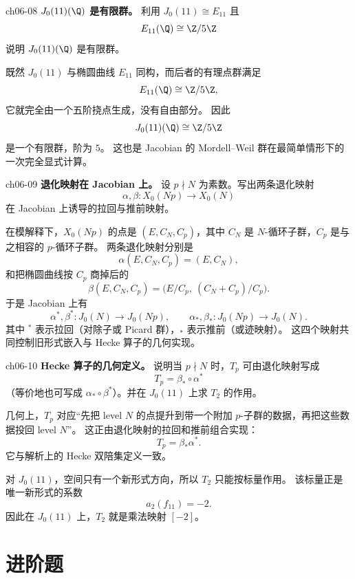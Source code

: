 \begin{problem}{ch06-08}
\textbf{$J_0(11)(\Q)$ 是有限群。}
利用 $J_0(11)\cong E_{11}$ 且
\[
E_{11}(\Q)\cong \Z/5\Z
\]
说明 $J_0(11)(\Q)$ 是有限群。
\end{problem}
\begin{solution}
既然 $J_0(11)$ 与椭圆曲线 $E_{11}$ 同构，而后者的有理点群满足
\[
E_{11}(\Q)\cong \Z/5\Z,
\]
它就完全由一个五阶挠点生成，没有自由部分。
因此
\[
J_0(11)(\Q)\cong \Z/5\Z
\]
是一个有限群，阶为 $5$。
这也是 Jacobian 的 Mordell--Weil 群在最简单情形下的一次完全显式计算。
\end{solution}

\begin{problem}{ch06-09}
\textbf{退化映射在 Jacobian 上。}
设 $p\nmid N$ 为素数。写出两条退化映射
\[
\alpha,\beta:X_0(Np)\to X_0(N)
\]
在 Jacobian 上诱导的拉回与推前映射。
\end{problem}
\begin{solution}
在模解释下，$X_0(Np)$ 的点是 $(E,C_N,C_p)$，其中 $C_N$ 是 $N$-循环子群，$C_p$ 是与之相容的 $p$-循环子群。
两条退化映射分别是
\[
\alpha(E,C_N,C_p)=(E,C_N),
\]
和把椭圆曲线按 $C_p$ 商掉后的
\[
\beta(E,C_N,C_p)=\bigl(E/C_p,\ (C_N+C_p)/C_p\bigr).
\]
于是 Jacobian 上有
\[
\alpha^*,\beta^*:J_0(N)\to J_0(Np),
\qquad
\alpha_*,\beta_*:J_0(Np)\to J_0(N).
\]
其中 $^*$ 表示拉回（对除子或 Picard 群），$_*$ 表示推前（或迹映射）。
这四个映射共同控制旧形式嵌入与 Hecke 算子的几何实现。
\end{solution}

\begin{problem}{ch06-10}
\textbf{Hecke 算子的几何定义。}
说明当 $p\nmid N$ 时，$T_p$ 可由退化映射写成
\[
T_p=\beta_*\circ \alpha^*
\]
（等价地也可写成 $\alpha_*\circ\beta^*$）。并在 $J_0(11)$ 上求 $T_2$ 的作用。
\end{problem}
\begin{solution}
几何上，$T_p$ 对应“先把 level $N$ 的点提升到带一个附加 $p$-子群的数据，再把这些数据投回 level $N$”。
这正由退化映射的拉回和推前组合实现：
\[
T_p=\beta_*\alpha^*.
\]
它与解析上的 Hecke 双陪集定义一致。

对 $J_0(11)$，空间只有一个新形式方向，所以 $T_2$ 只能按标量作用。
该标量正是唯一新形式的系数
\[
a_2(f_{11})=-2.
\]
因此在 $J_0(11)$ 上，$T_2$ 就是乘法映射 $[-2]$。
\end{solution}

\section{进阶题 \medium}

